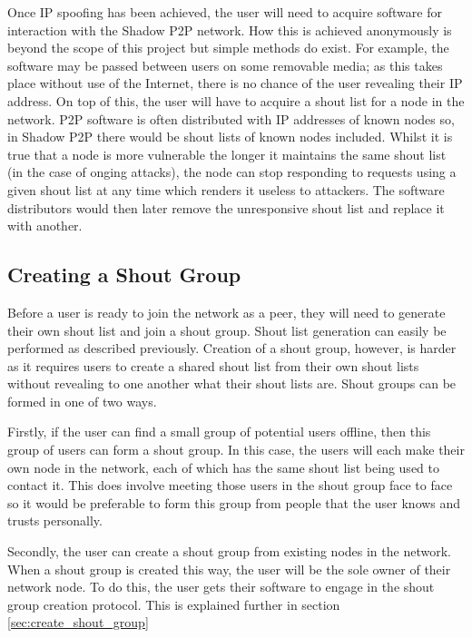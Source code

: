 \documentclass[ %
                    author={Luke Murray},
                supervisor={Dr. Simon Hollis},
                     title={Shadow Peer-to-Peer Networks},
                  subtitle={},
                    degree={MEng},
                      year={2013} ]{thesis}
\begin{document}

Once IP spoofing has been achieved, the user will need to acquire software for interaction with the Shadow P2P network. How this is achieved anonymously is beyond the scope of this project but simple methods do exist. For example, the software may be passed between users on some removable media; as this takes place without use of the Internet, there is no chance of the user revealing their IP address. On top of this, the user will have to acquire a shout list for a node in the network. P2P software is often distributed with IP addresses of known nodes so, in Shadow P2P there would be shout lists of known nodes included. Whilst it is true that a node is more vulnerable the longer it maintains the same shout list (in the case of onging attacks), the node can stop responding to requests using a given shout list at any time which renders it useless to attackers. The software distributors would then later remove the unresponsive shout list and replace it with another. 

\subsection{Creating a Shout Group}

Before a user is ready to join the network as a peer, they will need to generate their own shout list and join a shout group. Shout list generation can easily be performed as described previously. Creation of a shout group, however, is harder as it requires users to create a shared shout list from their own shout lists without revealing to one another what their shout lists are. Shout groups can be formed in one of two ways.

Firstly, if the user can find a small group of potential users offline, then this group of users can form a shout group. In this case, the users will each make their own node in the network, each of which has the same shout list being used to contact it. This does involve meeting those users in the shout group face to face so it would be preferable to form this group from people that the user knows and trusts personally.

Secondly, the user can create a shout group from existing nodes in the network. When a shout group is created this way, the user will be the sole owner of their network node. To do this, the user gets their software to engage in the shout group creation protocol. This is explained further in section \ref{sec:create_shout_group}
\end{document}
